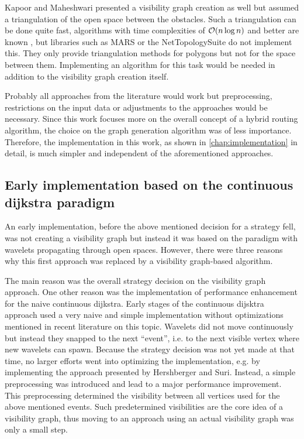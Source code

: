 		Kapoor and Maheshwari presented a visibility graph creation as well \cite{kapoor-shortest-path-vgraph} but assumed a triangulation of the open space between the obstacles.
		Such a triangulation can be done quite fast, algorithms with time complexities of $\mathcal{O}(n \log{n})$ and better are known \cite[58-60]{de-berg-computational-geometry}, but libraries such as MARS or the NetTopologySuite do not implement this.
		They only provide triangulation methods for polygons but not for the space between them.
		Implementing an algorithm for this task would be needed in addition to the visibility graph creation itself.
		
		Probably all approaches from the literature would work but preprocessing, restrictions on the input data or adjustments to the approaches would be necessary.
		Since this work focuses more on the overall concept of a hybrid routing algorithm, the choice on the graph generation algorithm was of less importance.
		Therefore, the implementation in this work, as shown in \cref{chap:implementation} in detail, is much simpler and independent of the aforementioned approaches.
		
	\subsection{Early implementation based on the continuous dijkstra paradigm}
		
		An early implementation, before the above mentioned decision for a strategy fell, was not creating a visibility graph but instead it was based on the  paradigm with wavelets propagating through open spaces.
		However, there were three reasons why this first approach was replaced by a visibility graph-based algorithm.
		
		The main reason was the overall strategy decision on the visibility graph approach.
		One other reason was the implementation of performance enhancement for the naive continuous dijkstra.
		Early stages of the continuous dijsktra approach used a very naive and simple implementation without optimizations mentioned in recent literature on this topic.
		Wavelets did not move continuously but instead they snapped to the next \enquote{event}, i.e. to the next visible vertex where new wavelets can spawn.
		Because the strategy decision was not yet made at that time, no larger efforts went into optimizing the implementation, e.g. by implementing the approach presented by Hershberger and Suri\cite{hershberger-suri}.
		Instead, a simple preprocessing was introduced and lead to a major performance improvement.
		This preprocessing determined the visibility between all vertices used for the above mentioned events.
		Such predetermined visibilities are the core idea of a visibility graph, thus moving to an approach using an actual visibility graph was only a small step.
		
